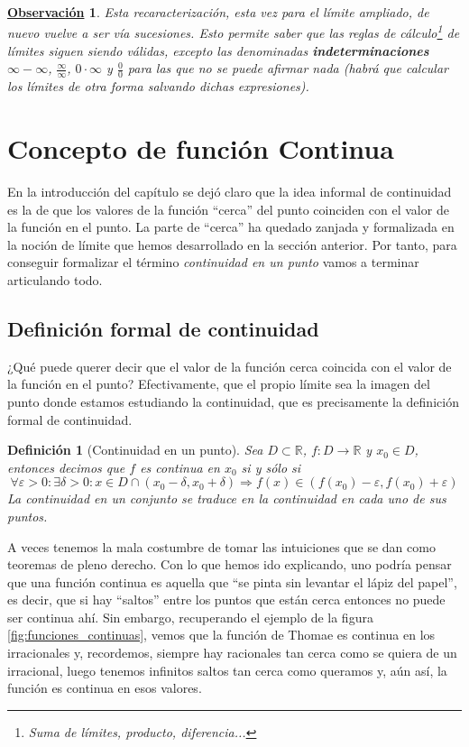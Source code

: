 \documentclass[10pt,a4paper,openright]{book}
\theoremstyle{break}
\newtheorem{defi}{Definición}[chapter]
\newtheorem{obs}{\underline{Observación}}[chapter]
\begin{document}
\begin{obs}
Esta recaracterización, esta vez para el límite ampliado, de nuevo vuelve a ser vía sucesiones. Esto permite saber que las reglas de cálculo\footnote{Suma de límites, producto, diferencia...} de límites siguen siendo válidas, excepto las denominadas \textbf{indeterminaciones} $\infty-\infty$, $\frac{\infty}{\infty}$, $0\cdot \infty$ y $\frac{0}{0}$ para las que no se puede afirmar nada (habrá que calcular los límites de otra forma salvando dichas expresiones).
\end{obs}

\section{Concepto de función Continua}
En la introducción del capítulo se dejó claro que la idea informal de continuidad es la de que los valores de la función ``cerca'' del punto coinciden con el valor de la función en el punto. La parte de ``cerca'' ha quedado zanjada y formalizada en la noción de límite que hemos desarrollado en la sección anterior. Por tanto, para conseguir formalizar el término \textit{continuidad en un punto} vamos a terminar articulando todo.

\subsection{Definición formal de continuidad}
¿Qué puede querer decir que el valor de la función cerca coincida con el valor de la función en el punto? Efectivamente, que el propio límite sea la imagen del punto donde estamos estudiando la continuidad, que es precisamente la definición formal de continuidad.

\begin{defi}[Continuidad en un punto]
Sea $D\subset \mathbb R$, $f: D\longrightarrow \mathbb R$ y $x_0\in D$, entonces decimos que $f$ es continua en $x_0$ si y sólo si
$$\forall \varepsilon >0 : \exists \delta >0: x\in D\cap (x_0-\delta, x_0+\delta)\Rightarrow f(x)\in (f(x_0)-\varepsilon, f(x_0)+\varepsilon)$$
La continuidad en un conjunto se traduce en la continuidad en cada uno de sus puntos.
\end{defi}

A veces tenemos la mala costumbre de tomar las intuiciones que se dan como teoremas de pleno derecho. Con lo que hemos ido explicando, uno podría pensar que una función continua es aquella que ``se pinta sin levantar el lápiz del papel'', es decir, que si hay ``saltos'' entre los puntos que están cerca entonces no puede ser continua ahí. Sin embargo, recuperando el ejemplo de la figura \ref{fig:funciones_continuas}, vemos que la función de Thomae es continua en los irracionales y, recordemos, siempre hay racionales tan cerca como se quiera de un irracional, luego tenemos infinitos saltos tan cerca como queramos y, aún así, la función es continua en esos valores.
\end{document}
